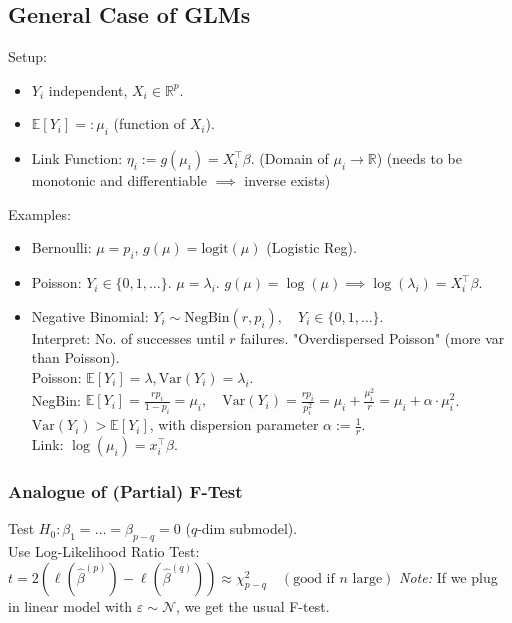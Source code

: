 \subsection{General Case of GLMs}
Setup:
\begin{itemize}
    \item $Y_i$ independent, $X_i \in \mathbb{R}^p$.
    \item $\mathbb{E}[Y_i] =: \mu_i$ (function of $X_i$).
    \item Link Function: $\eta_i := g(\mu_i) = X_i^\top \beta$. (Domain of $\mu_i \to \mathbb{R}$) (needs to be monotonic and differentiable $\implies$ inverse exists)
\end{itemize}

Examples:
\begin{itemize}
    \item Bernoulli: $\mu=p_i$, $g(\mu)=\text{logit}(\mu)$ (Logistic Reg).
    \item Poisson: $Y_i \in \{0, 1, \dots\}$. $\mu=\lambda_i$. $g(\mu)=\log(\mu) \implies \log(\lambda_i) = X_i^\top \beta$.
    \item Negative Binomial: $Y_i \sim \text{NegBin}(r, p_i), \quad Y_i \in \{0, 1, \dots\}$.
    \\ Interpret: No. of successes until $r$ failures. "Overdispersed Poisson" (more var than Poisson).
    \\ Poisson: $\mathbb{E}[Y_i]=\lambda, \text{Var}(Y_i)=\lambda_i$.
    \\ NegBin: $\mathbb{E}[Y_i] = \frac{r p_i}{1-p_i} = \mu_i, \quad \text{Var}(Y_i) = \frac{r p_i}{p_i^2} = \mu_i + \frac{\mu_i^2}{r} = \mu_i + \alpha \cdot \mu_i^2$.
    \\ $\text{Var}(Y_i) > \mathbb{E}[Y_i]$, with dispersion parameter $\alpha := \frac{1}{r}$.
    \\ Link: $\log(\mu_i) = x_i^\top \beta$.
\end{itemize}

\subsubsection*{Analogue of (Partial) F-Test}
Test $H_0: \beta_{1} = \dots = \beta_{p-q} = 0$ ($q$-dim submodel).
\\ Use Log-Likelihood Ratio Test:
$ t = 2(\ell(\hat{\beta}^{(p)}) - \ell(\hat{\beta}^{(q)})) \approx \chi^2_{p-q} \quad (\text{good if } n \text{ large}) $
\textit{Note:} If we plug in linear model with $\varepsilon \sim \mathcal{N}$, we get the usual F-test.

